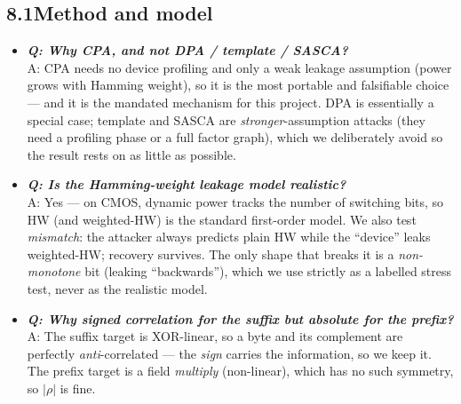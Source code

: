 \documentclass[11pt]{article}
\begin{document}
\subsection*{8.1\quad Method and model}
\begin{itemize}
\item \textbf{\textit{Q: Why CPA, and not DPA / template / SASCA?}}\\
A: CPA needs no device profiling and only a weak leakage assumption (power grows with
Hamming weight), so it is the most portable and falsifiable choice --- and it is the mandated
mechanism for this project. DPA is essentially a special case; template and SASCA are
\emph{stronger}-assumption attacks (they need a profiling phase or a full factor graph), which
we deliberately avoid so the result rests on as little as possible.
\item \textbf{\textit{Q: Is the Hamming-weight leakage model realistic?}}\\
A: Yes --- on CMOS, dynamic power tracks the number of switching bits, so HW (and weighted-HW)
is the standard first-order model. We also test \emph{mismatch}: the attacker always predicts
plain HW while the ``device'' leaks weighted-HW; recovery survives. The only shape that breaks
it is a \emph{non-monotone} bit (leaking ``backwards''), which we use strictly as a labelled
stress test, never as the realistic model.
\item \textbf{\textit{Q: Why signed correlation for the suffix but absolute for the prefix?}}\\
A: The suffix target is XOR-linear, so a byte and its complement are perfectly
\emph{anti}-correlated --- the \emph{sign} carries the information, so we keep it. The prefix
target is a field \emph{multiply} (non-linear), which has no such symmetry, so $|\rho|$ is fine.
\end{itemize}
\end{document}
